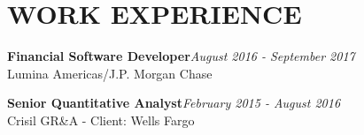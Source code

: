 \documentclass[letterpaper]{article}
\renewenvironment{itemize}{
  \begin{list}{}{
    \setlength{\leftmargin}{1.5em}
  }
}{
  \end{list}
}
\begin{document}
\section*{WORK EXPERIENCE}

\begin{itemize}
 
 \item \textbf{Financial Software Developer}\hfill \emph{August 2016 - September 2017} \\
 Lumina Americas/J.P. Morgan Chase

 \item \textbf{Senior Quantitative Analyst}\hfill \emph{February 2015 - August 2016} \\
 Crisil GR\&A - Client: Wells Fargo
 
\end{itemize}
 
\end{document}
